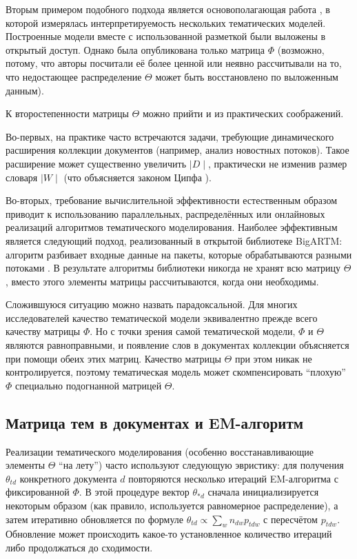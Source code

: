 Вторым примером подобного подхода является основополагающая работа \cite{rtl}, в которой измерялась интерпретируемость нескольких тематических моделей. Построенные модели вместе с использованной разметкой были выложены в открытый доступ. Однако была опубликована только матрица $\Phi $ (возможно, потому, что авторы посчитали её более ценной или неявно рассчитывали на то, что недостающее распределение $\Theta$ может быть восстановлено по выложенным данным).  

К второстепенности матрицы $\Theta$ можно прийти и из практических соображений.  

Во-первых, на практике часто встречаются задачи, требующие динамического расширения коллекции документов (например, анализ новостных потоков). Такое расширение может существенно увеличить $\mid D\mid$, практически не изменив размер словаря $\mid W \mid$ (что объясняется законом Ципфа ).  

Во-вторых, требование вычислительной эффективности естественным образом приводит к использованию параллельных, распределённых или онлайновых реализаций алгоритмов тематического моделирования. Наиболее эффективным является следующий подход, реализованный в открытой библиотеке BigARTM: алгоритм разбивает входные данные на пакеты, которые обрабатываются разными потоками \cite{frei2016parallel}. В результате алгоритмы библиотеки никогда не хранят всю матрицу $\Theta$, вместо этого элементы матрицы рассчитываются, когда они необходимы.  

Сложившуюся ситуацию можно назвать парадоксальной. Для многих исследователей качество тематической модели эквивалентно прежде всего качеству матрицы $\Phi$. Но с точки зрения самой тематической модели, $\Phi$ и $\Theta$ являются равноправными, и появление слов в документах коллекции объясняется при помощи обеих этих матриц. Качество матрицы $\Theta$ при этом никак не контролируется, поэтому тематическая модель может скомпенсировать ``плохую'' $\Phi$ специально подогнанной матрицей $\Theta$.  

\subsection{Матрица тем в документах и EM-алгоритм} 

\label{sec:theta_inference} 

Реализации тематического моделирования (особенно  восстанавливающие элементы $\Theta$ ``на лету'') часто используют следующую эвристику: для получения $\theta_{td}$ конкретного документа $d$ повторяются несколько итераций EM-алгоритма с фиксированной $\Phi$. В этой процедуре вектор $\theta_{\ast d}$ сначала инициализируется некоторым образом (как правило, используется равномерное распределение), а затем итеративно обновляется по формуле $\theta_{td}  \propto \sum_{w} n_{dw} p_{tdw}$ с пересчётом $p_{tdw}$. Обновление может происходить какое-то установленное количество итераций либо продолжаться до сходимости.  

